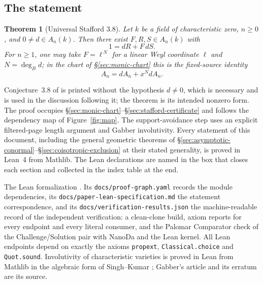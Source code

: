 \documentclass[11pt]{article}
\theoremstyle{plain}
\newtheorem{theorem}{Theorem}[section]
\theoremstyle{definition}
\theoremstyle{remark}
\theoremstyle{plain}
\begin{document}
\subsection*{The statement}

\begin{theorem}[Universal Stafford 3.8]\label{thm:main}
Let $k$ be a field of characteristic zero, $n\ge0$, and $0\neq d\in A_n(k)$.
Then there exist $F,R,S\in A_n(k)$ with
\[
  1=dR+F\,dS .
\]
For $n\ge1$, one may take $F=\ell^{\,N}$ for a linear Weyl coordinate $\ell$ and
$N=\deg_B d$; in the chart of \S\ref{sec:monic-chart} this is the fixed-source
identity
\[
  A_n=dA_n+x^N dA_n. \tag{SOURCE-$x^N$}\label{eq:sourcexn}
\]
\end{theorem}

Conjecture~3.8 of \cite{Stafford} is printed without the hypothesis
$d\neq0$, which is necessary and is used in the discussion following it; the
theorem is its intended nonzero form. The proof occupies
\S\ref{sec:monic-chart}--\S\ref{sec:stafford-certificate} and follows the
dependency map of Figure~\ref{fig:map}. The support-avoidance step uses an
explicit filtered-page length argument and Gabber involutivity. Every
statement of this document, including the general geometric theorems of
\S\ref{sec:asymptotic-conormal}--\S\ref{sec:coisotropic-exclusion} at their
stated generality, is proved in Lean~4 from Mathlib. The Lean declarations are
named in the box that closes each section and collected in the index table at
the end.

\begin{provbox}
The Lean formalization . Its
\texttt{docs/proof-graph.yaml} records the module dependencies, its
\texttt{docs/paper-lean-specification.md} the statement correspondence, and
its \texttt{docs/verification-results.json} the machine-readable record of
the independent verification: a clean-clone build, axiom reports for every
endpoint and every literal consumer, and the Palomar Comparator check of the
Challenge/Solution pair with NanoDa and the Lean kernel. All Lean endpoints
depend on exactly the axioms \texttt{propext}, \texttt{Classical.choice} and
\texttt{Quot.sound}. Involutivity of characteristic varieties is proved in
Lean from Mathlib in the algebraic form of Singh--Kumar \cite{SinghKumar};
Gabber's article \cite{Gabber} and its erratum \cite{GabberErratum} are its
source.
\end{provbox}
\end{document}
